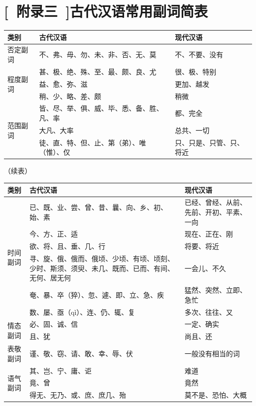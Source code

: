 \section{[\ 附录三\ ]古代汉语常用副词简表}

\noindent
\begin{tabular}{|l|p{12em}|p{6em}|}
	\hline
	类别   & 古代汉语  & 现代汉语\\ \hline
	否定副词   & 不、弗、毋、勿、未、非、否、无、莫 & 不、不要、没有 \\ \hline
	\multirow{3}{*}{程度副词} & 甚、极、绝、殊、至、最、颇、良、尤  & 很、极、特别\\ \cline{2-3} 
	& 益、愈、弥、滋                    & 更加、越发\\ \cline{2-3} 
	& 稍、少、略、差、颇                 & 稍微\\ \hline
	\multirow{3}{*}{范围副词} & 皆、尽、举、俱、威、毕、悉、备、胜、凡、率 & 都、完全\\ \cline{2-3} 
	& 大凡、大率 & 总共、一切\\ \cline{2-3} 
	& 徒、直、特、但、止、第（弟）、唯（惟）、仅 & 只、只是、只管、只、将近\\ \hline
\end{tabular}
\newpage

\begin{flushright}
	（续表）
\end{flushright}
\begin{tabular}{|l|p{12em}|p{6em}|}
	\hline
	\textbf{类别} & \textbf{古代汉语}   & \textbf{现代汉语} \\ \hline
	\multirow{6}{*}{时间副词} & 已、既、业、尝、曾、昔、曩、向、乡、初、始、素 & 已经、曾经、从前、先前、开初、平素、一向 \\ \cline{2-3} 
	& 今、方、正、适 & 现在、正在、刚\\ \cline{2-3} 
	& 欲、将、且、垂、几、行 & 将要、将近\\ \cline{2-3} 
	& 寻、旋、俄、俄而、俄顷、少顷、有顷、顷刻、少时、斯须、须臾、未几、既而、已而、有间、无何、居无何 & 一会儿、不久\\ \cline{2-3} 
	& 奄、暴、卒（猝）、忽、遽、即、立、急、疾  & 猛然、突然、立即、急忙\\ \cline{2-3} 
	& 数、屡、亟（qì）、连、仍、辄、复 & 多次、往往、又\\ \hline
\multirow{2}{*}{情态副词} & 必、固、诚、信         & 一定、确实\\ \cline{2-3} 
& 且、犹             & 尚且、还\\ \hline
表敬副词                  & 谨、敬、窃、请、敢、幸、辱、伏 & 一般没有相当的词\\ \hline
\multirow{3}{*}{语气副词} & 其、岂、宁、庸、讵       & 难道\\ \cline{2-3} 
& 竟、曾             & 竟然\\ \cline{2-3} 
& 得无、无乃、或、庶、庶几、殆  & 莫不是、恐怕、大概\\ \hline
\end{tabular}
\newpage
